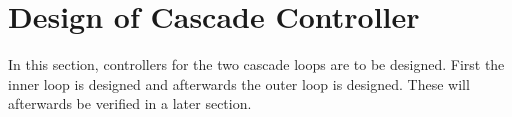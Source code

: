 \section{Design of Cascade Controller}
In this section, controllers for the two cascade loops are to be designed. First the inner loop is designed and afterwards the outer loop is designed. These will afterwards be verified in a later section. 


